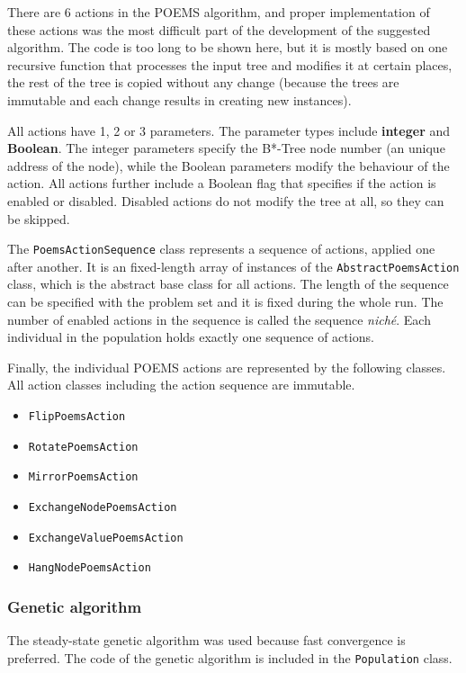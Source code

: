 There are 6 actions in the POEMS algorithm, and proper implementation of these actions was the most difficult part of the development of the suggested algorithm. The code is too long to be shown here, but it is mostly based on one recursive function that processes the input tree and modifies it at certain places, the rest of the tree is copied without any change (because the trees are immutable and each change results in creating new instances).

All actions have 1, 2 or 3 parameters. The parameter types include {\bf integer} and {\bf Boolean}. The integer parameters specify the B*-Tree node number (an unique address of the node), while the Boolean parameters modify the behaviour of the action. All actions further include a Boolean flag that specifies if the action is enabled or disabled. Disabled actions do not modify the tree at all, so they can be skipped. 

The {\tt PoemsActionSequence} class represents a sequence of actions, applied one after another. It is an fixed-length array of instances of the {\tt AbstractPoemsAction} class, which is the abstract base class for all actions. The length of the sequence can be specified with the problem set and it is fixed during the whole run. The number of enabled actions in the sequence is called the sequence {\em niché}. Each individual in the population holds exactly one sequence of actions. 

Finally, the individual POEMS actions are represented by the following classes. All action classes including the action sequence are immutable.

\begin{itemize}
\item{{\tt FlipPoemsAction}}
\item{{\tt RotatePoemsAction}}
\item{{\tt MirrorPoemsAction}}
\item{{\tt ExchangeNodePoemsAction}}
\item{{\tt ExchangeValuePoemsAction}}
\item{{\tt HangNodePoemsAction}}
\end{itemize}

\subsubsection{Genetic algorithm}

The steady-state genetic algorithm was used because fast convergence is preferred. The code of the genetic algorithm is included in the {\tt Population} class. 

